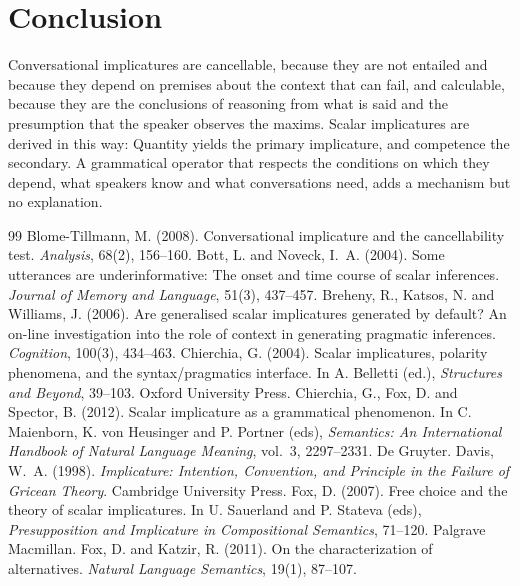 \documentclass{situationist-preprint}
\begin{document}
\section{Conclusion}

Conversational implicatures are cancellable, because they are not entailed and because they depend on premises about the context that can fail, and calculable, because they are the conclusions of reasoning from what is said and the presumption that the speaker observes the maxims. Scalar implicatures are derived in this way: Quantity yields the primary implicature, and competence the secondary. A grammatical operator that respects the conditions on which they depend, what speakers know and what conversations need, adds a mechanism but no explanation.

\begin{thebibliography}{99}\small
{} Blome-Tillmann, M. (2008). Conversational implicature and the cancellability test. \emph{Analysis}, 68(2), 156--160.
 Bott, L. and Noveck, I.~A. (2004). Some utterances are underinformative: The onset and time course of scalar inferences. \emph{Journal of Memory and Language}, 51(3), 437--457.
 Breheny, R., Katsos, N. and Williams, J. (2006). Are generalised scalar implicatures generated by default? An on-line investigation into the role of context in generating pragmatic inferences. \emph{Cognition}, 100(3), 434--463.
 Chierchia, G. (2004). Scalar implicatures, polarity phenomena, and the syntax/pragmatics interface. In A. Belletti (ed.), \emph{Structures and Beyond}, 39--103. Oxford University Press.
 Chierchia, G., Fox, D. and Spector, B. (2012). Scalar implicature as a grammatical phenomenon. In C. Maienborn, K. von Heusinger and P. Portner (eds), \emph{Semantics: An International Handbook of Natural Language Meaning}, vol.~3, 2297--2331. De Gruyter.
 Davis, W.~A. (1998). \emph{Implicature: Intention, Convention, and Principle in the Failure of Gricean Theory}. Cambridge University Press.
 Fox, D. (2007). Free choice and the theory of scalar implicatures. In U. Sauerland and P. Stateva (eds), \emph{Presupposition and Implicature in Compositional Semantics}, 71--120. Palgrave Macmillan.
 Fox, D. and Katzir, R. (2011). On the characterization of alternatives. \emph{Natural Language Semantics}, 19(1), 87--107.

\end{thebibliography}
\end{document}
